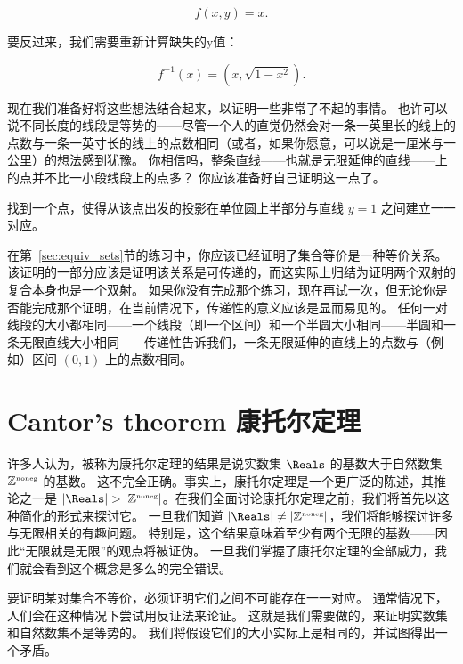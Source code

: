 \[ f(x, y) = x.
\]

要反过来，我们需要重新计算缺失的y值：

\[ f^{-1}(x) = (x, \sqrt{1 - x^2}).\]

现在我们准备好将这些想法结合起来，以证明一些非常了不起的事情。
也许可以说不同长度的线段是等势的——尽管一个人的直觉仍然会对一条一英里长的线上的点数与一条一英寸长的线上的点数相同（或者，如果你愿意，可以说是一厘米与一公里）的想法感到犹豫。
你相信吗，整条直线——也就是无限延伸的直线——上的点并不比一小段线段上的点多？
你应该准备好自己证明这一点了。

\begin{exer}
    找到一个点，使得从该点出发的投影在单位圆上半部分与直线 $y = 1$ 之间建立一一对应。
\end{exer}

在第~\ref{sec:equiv_sets}节的练习中，你应该已经证明了集合等价是一种等价关系。
该证明的一部分应该是证明该关系是可传递的，而这实际上归结为证明两个双射的复合本身也是一个双射。
如果你没有完成那个练习，现在再试一次，但无论你是否能完成那个证明，在当前情况下，传递性的意义应该是显而易见的。
任何一对线段的大小都相同——一个线段（即一个区间）和一个半圆大小相同——半圆和一条无限直线大小相同——传递性告诉我们，一条无限延伸的直线上的点数与（例如）区间 $(0, 1)$ 上的点数相同。

\clearpage




\newpage

\section{Cantor's theorem 康托尔定理}
\label{sec:cantors_thm}

许多人认为，被称为康托尔定理的结果是说实数集 $\Reals$ 的基数大于自然数集 ${\mathbb Z}^{\mbox{\tiny noneg}}$ 的基数。
这不完全正确。事实上，康托尔定理是一个更广泛的陈述，其推论之一是 $|\Reals| > |\Naturals|$。在我们全面讨论康托尔定理之前，我们将首先以这种简化的形式来探讨它。
一旦我们知道 $|\Reals| \neq |\Naturals|$，我们将能够探讨许多与无限相关的有趣问题。
特别是，这个结果意味着至少有两个无限的基数——因此“无限就是无限”的观点将被证伪。
一旦我们掌握了康托尔定理的全部威力，我们就会看到这个概念是多么的完全错误。

要证明某对集合不等价，必须证明它们之间不可能存在一一对应。
通常情况下，人们会在这种情况下尝试用反证法来论证。
这就是我们需要做的，来证明实数集和自然数集不是等势的。
我们将假设它们的大小实际上是相同的，并试图得出一个矛盾。

